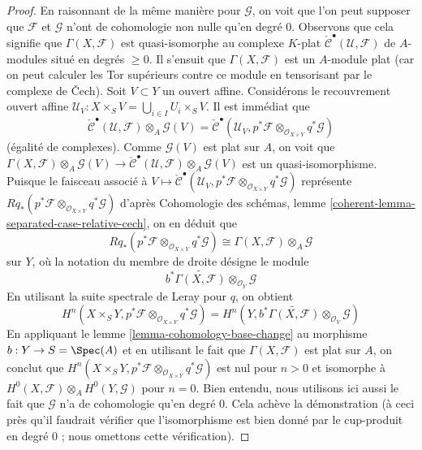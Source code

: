 \begin{proof}
\medskip\noindent
En raisonnant de la même manière pour $\mathcal{G}$, on voit que l'on
peut supposer que $\mathcal{F}$ et $\mathcal{G}$
n'ont de cohomologie non nulle qu'en degré $0$.
Observons que cela signifie que $\Gamma(X, \mathcal{F})$
est quasi-isomorphe au complexe $K$-plat
$\check{\mathcal{C}}^\bullet(\mathcal{U}, \mathcal{F})$
de $A$-modules situé en degrés $\geq 0$.
Il s'ensuit que $\Gamma(X, \mathcal{F})$ est un $A$-module plat
(car on peut calculer les Tor supérieurs contre ce module
en tensorisant par le complexe de \v{C}ech).
Soit $V \subset Y$ un ouvert affine. Considérons le recouvrement ouvert affine
$\mathcal{U}_V : X \times_S V = \bigcup_{i \in I} U_i \times_S V$.
Il est immédiat que
$$
\check{\mathcal{C}}^\bullet(\mathcal{U}, \mathcal{F})
\otimes_A \mathcal{G}(V) =
\check{\mathcal{C}}^\bullet(\mathcal{U}_V,
p^*\mathcal{F} \otimes_{\mathcal{O}_{X \times Y}}
q^*\mathcal{G})
$$
(égalité de complexes). Comme $\mathcal{G}(V)$ est plat
sur $A$, on voit que
$\Gamma(X, \mathcal{F}) \otimes_A \mathcal{G}(V) \to
\check{\mathcal{C}}^\bullet(\mathcal{U}, \mathcal{F})
\otimes_A \mathcal{G}(V)$ est un quasi-isomorphisme.
Puisque le faisceau associé à
$V \mapsto \check{\mathcal{C}}^\bullet(\mathcal{U}_V,
p^*\mathcal{F} \otimes_{\mathcal{O}_{X \times Y}}
q^*\mathcal{G})$ représente
$Rq_*(p^*\mathcal{F} \otimes_{\mathcal{O}_{X \times Y}} q^*\mathcal{G})$
d'après Cohomologie des schémas, lemme
\ref{coherent-lemma-separated-case-relative-cech},
on en déduit que
$$
Rq_*(p^*\mathcal{F} \otimes_{\mathcal{O}_{X \times Y}} q^*\mathcal{G})
\cong
\Gamma(X, \mathcal{F}) \otimes_A \mathcal{G}
$$
sur $Y$, où la notation du membre de droite désigne le module
$$
b^*\widetilde{\Gamma(X, \mathcal{F})} \otimes_{\mathcal{O}_Y} \mathcal{G}
$$
En utilisant la suite spectrale de Leray pour $q$, on obtient
$$
H^n(X \times_S Y, p^*\mathcal{F} \otimes_{\mathcal{O}_{X \times Y}}
q^*\mathcal{G}) =
H^n(Y,
b^*\widetilde{\Gamma(X, \mathcal{F})} \otimes_{\mathcal{O}_Y} \mathcal{G})
$$
En appliquant le lemme \ref{lemma-cohomology-base-change} au morphisme
$b : Y \to S = \Spec(A)$ et en utilisant le fait que $\Gamma(X, \mathcal{F})$
est plat sur $A$, on conclut que
$H^n(X \times_S Y, p^*\mathcal{F} \otimes_{\mathcal{O}_{X \times Y}}
q^*\mathcal{G})$ est nul pour $n > 0$ et isomorphe à
$H^0(X, \mathcal{F}) \otimes_A H^0(Y, \mathcal{G})$ pour $n = 0$.
Bien entendu, nous utilisons ici aussi le fait que $\mathcal{G}$ n'a de
cohomologie qu'en degré $0$.
Cela achève la démonstration (à ceci près qu'il faudrait vérifier que
l'isomorphisme est bien donné par le cup-produit en degré $0$ ; nous omettons
cette vérification).
\end{proof}

